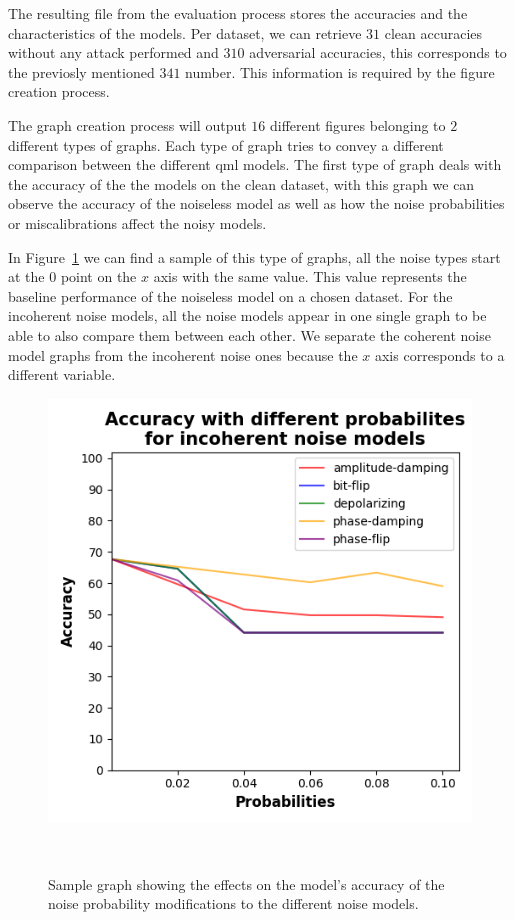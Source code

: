 The resulting file from the evaluation process stores the
accuracies and the characteristics of the models. Per dataset,
we can retrieve \(31\) clean accuracies without any attack
performed and \(310\) adversarial accuracies, this corresponds
to the previosly mentioned \(341\) number. This information
is required by the figure creation process. \

The graph creation process will output \(16\) different
figures belonging to \(2\) different types of graphs. Each
type of graph tries to convey a different comparison between
the different \ac{qml} models. The first type of graph deals
with the accuracy of the the models on the clean dataset, 
with this graph we can observe the accuracy of the noiseless
model as well as how the noise probabilities or miscalibrations
affect the noisy models. \

In Figure~\ref{fig:sample-accuracy} we
can find a sample of this type of graphs, all the noise types
start at the \(0\) point on the \(x\) axis with the same value. This
value represents the baseline performance of the noiseless model
on a chosen dataset. For the incoherent noise models, all the
noise models appear in one single graph to be able to also compare
them between each other. We separate the coherent noise model graphs
from the incoherent noise ones because the \(x\) axis corresponds to
a different variable. \

\begin{figure}[h!]
  \includegraphics[scale=0.70]{figures/accuracy-graph.png}
  \centering
  \caption{Sample graph showing the effects on the model's accuracy of the noise probability modifications to the different noise models.}
~\label{fig:sample-accuracy}
\end{figure} \

